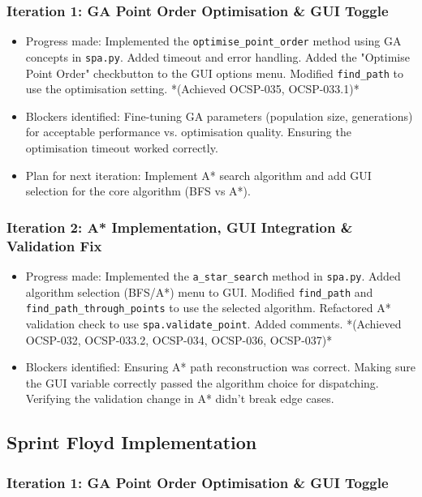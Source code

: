 \subsubsection{Iteration 1: GA Point Order Optimisation \& GUI Toggle}
\begin{itemize}
	\item Progress made: Implemented the \verb|optimise_point_order| method using GA concepts in \verb|spa.py|. Added timeout and error handling. Added the "Optimise Point Order" checkbutton to the GUI options menu. Modified \verb|find_path| to use the optimisation setting. *(Achieved OCSP-035, OCSP-033.1)*
	\item Blockers identified: Fine-tuning GA parameters (population size, generations) for acceptable performance vs. optimisation quality. Ensuring the optimisation timeout worked correctly.
	\item Plan for next iteration: Implement A* search algorithm and add GUI selection for the core algorithm (BFS vs A*).
\end{itemize}

\subsubsection{Iteration 2: A* Implementation, GUI Integration \& Validation Fix}
\begin{itemize}
	\item Progress made: Implemented the \verb|a_star_search| method in \verb|spa.py|. Added algorithm selection (BFS/A*) menu to GUI. Modified \verb|find_path| and \verb|find_path_through_points| to use the selected algorithm. Refactored A* validation check to use \verb|spa.validate_point|. Added comments. *(Achieved OCSP-032, OCSP-033.2, OCSP-034, OCSP-036, OCSP-037)*
	\item Blockers identified: Ensuring A* path reconstruction was correct. Making sure the GUI variable correctly passed the algorithm choice for dispatching. Verifying the validation change in A* didn't break edge cases.
\end{itemize}

\subsection{Sprint Floyd Implementation}

\subsubsection{Iteration 1: GA Point Order Optimisation \& GUI Toggle}

